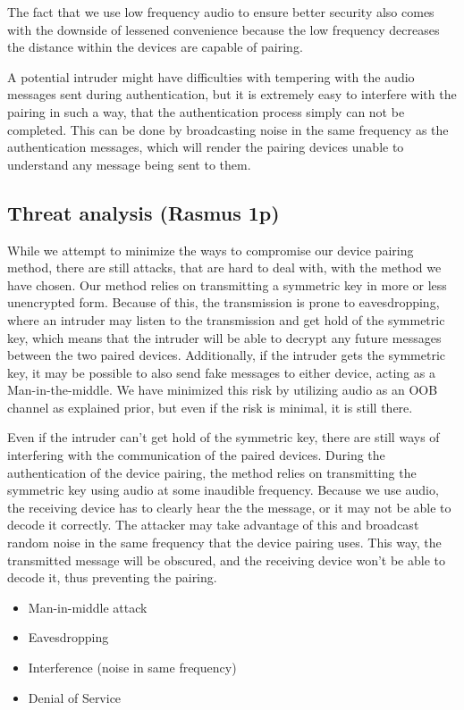 \documentclass[12pt]{article}
\begin{document}
The fact that we use low frequency audio to ensure better security also comes with the downside of lessened convenience because the low frequency decreases the distance within the devices are capable of pairing.

A potential intruder might have difficulties with tempering with the audio messages sent during authentication, but it is extremely easy to interfere with the pairing in such a way, that the authentication process simply can not be completed. This can be done by broadcasting noise in the same frequency as the authentication messages, which will render the pairing devices unable to understand any message being sent to them.


\subsection{Threat analysis (Rasmus 1p)}
\label{sub:Threat analysis}

While we attempt to minimize the ways to compromise our device pairing method, there are still attacks, that are hard to deal with, with the method we have chosen. Our method relies on transmitting a symmetric key in more or less unencrypted form. Because of this, the transmission is prone to eavesdropping, where an intruder may listen to the transmission and get hold of the symmetric key, which means that the intruder will be able to decrypt any future messages between the two paired devices. Additionally, if the intruder gets the symmetric key, it may be possible to also send fake messages to either device, acting as a Man-in-the-middle. We have minimized this risk by utilizing audio as an OOB channel as explained prior, but even if the risk is minimal, it is still there.

Even if the intruder can't get hold of the symmetric key, there are still ways of interfering with the communication of the paired devices. During the authentication of the device pairing, the method relies on transmitting the symmetric key using audio at some inaudible frequency. Because we use audio, the receiving device has to clearly hear the the message, or it may not be able to decode it correctly. The attacker may take advantage of this and broadcast random noise in the same frequency that the device pairing uses. This way, the transmitted message will be obscured, and the receiving device won't be able to decode it, thus preventing the pairing.

\begin{itemize}
    \item Man-in-middle attack
    \item Eavesdropping
    \item Interference (noise in same frequency)
    \item Denial of Service
\end{itemize}
\end{document}
